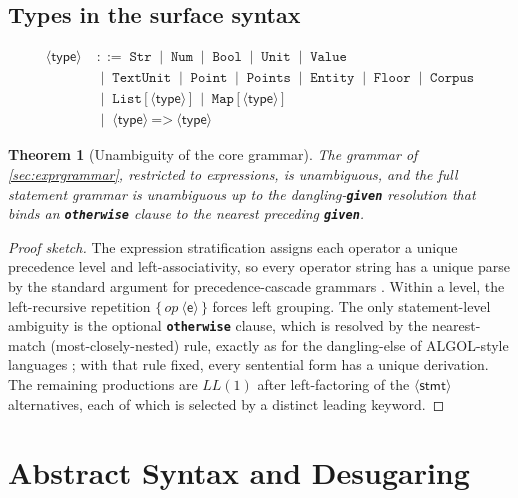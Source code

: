 \documentclass[11pt,a4paper]{article}
\theoremstyle{plain}
\newtheorem{theorem}{Theorem}[section]
\theoremstyle{definition}
\theoremstyle{remark}
\newcommand{\nt}[1]{\ensuremath{\langle\textsf{#1}\rangle}}  %
\newcommand{\tm}[1]{\textbf{\texttt{#1}}}                 %
\newcommand{\rep}[1]{\ensuremath{\{\,#1\,\}}}             %
\newcommand{\bnfeq}{\;::=\;}
\newcommand{\bnfor}{\;\mid\;}
\begin{document}
\subsection{Types in the surface syntax}

\begin{align*}
\nt{type}  &\bnfeq \texttt{Str}\bnfor\texttt{Num}\bnfor\texttt{Bool}\bnfor
                   \texttt{Unit}\bnfor\texttt{Value}\\
           &\bnfor \texttt{TextUnit}\bnfor\texttt{Point}\bnfor\texttt{Points}
                   \bnfor\texttt{Entity}\bnfor\texttt{Floor}\bnfor\texttt{Corpus}\\
           &\bnfor \texttt{List}\,\texttt{[}\,\nt{type}\,\texttt{]}
                   \bnfor \texttt{Map}\,\texttt{[}\,\nt{type}\,\texttt{]}\\
           &\bnfor \nt{type}\ \texttt{=>}\ \nt{type}
\end{align*}

\begin{theorem}[Unambiguity of the core grammar]
\label{thm:unambiguous}
The grammar of \cref{sec:exprgrammar}, restricted to expressions, is
unambiguous, and the full statement grammar is unambiguous up to the
dangling-\tm{given} resolution that binds an \tm{otherwise} clause to the
nearest preceding \tm{given}.
\end{theorem}
\begin{proof}[Proof sketch]
The expression stratification assigns each operator a unique precedence level
and left-associativity, so every operator string has a unique parse by the
standard argument for precedence-cascade grammars \citep{aho2006}. Within a
level, the left-recursive repetition $\rep{op\ \nt{e}}$ forces left grouping.
The only statement-level ambiguity is the optional \tm{otherwise} clause, which
is resolved by the nearest-match (most-closely-nested) rule, exactly as for the
dangling-else of ALGOL-style languages \citep{naur1963}; with that rule fixed,
every sentential form has a unique derivation. The remaining productions are
$LL(1)$ after left-factoring of the \nt{stmt} alternatives, each of which is
selected by a distinct leading keyword.
\end{proof}

\section{Abstract Syntax and Desugaring}
\label{sec:abstract}
\end{document}
